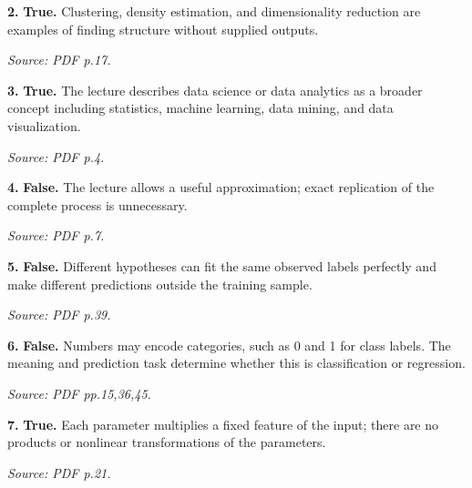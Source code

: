 \documentclass[11pt,a4paper]{article}
\begin{document}
\par\noindent\begin{minipage}{\linewidth}
\textbf{2.} \textbf{True.} Clustering, density estimation, and dimensionality reduction are examples of finding structure without supplied outputs.

{\footnotesize\textit{Source: PDF p.17.}}
\end{minipage}\par\vspace{3mm}
\par\noindent\begin{minipage}{\linewidth}
\textbf{3.} \textbf{True.} The lecture describes data science or data analytics as a broader concept including statistics, machine learning, data mining, and data visualization.

{\footnotesize\textit{Source: PDF p.4.}}
\end{minipage}\par\vspace{3mm}
\par\noindent\begin{minipage}{\linewidth}
\textbf{4.} \textbf{False.} The lecture allows a useful approximation; exact replication of the complete process is unnecessary.

{\footnotesize\textit{Source: PDF p.7.}}
\end{minipage}\par\vspace{3mm}
\par\noindent\begin{minipage}{\linewidth}
\textbf{5.} \textbf{False.} Different hypotheses can fit the same observed labels perfectly and make different predictions outside the training sample.

{\footnotesize\textit{Source: PDF p.39.}}
\end{minipage}\par\vspace{3mm}
\par\noindent\begin{minipage}{\linewidth}
\textbf{6.} \textbf{False.} Numbers may encode categories, such as 0 and 1 for class labels. The meaning and prediction task determine whether this is classification or regression.

{\footnotesize\textit{Source: PDF pp.15,36,45.}}
\end{minipage}\par\vspace{3mm}
\par\noindent\begin{minipage}{\linewidth}
\textbf{7.} \textbf{True.} Each parameter multiplies a fixed feature of the input; there are no products or nonlinear transformations of the parameters.

{\footnotesize\textit{Source: PDF p.21.}}
\end{minipage}\par\vspace{3mm}
\end{document}
